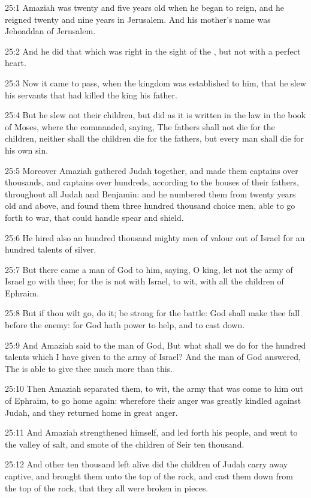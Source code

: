25:1 Amaziah was twenty and five years old when he began to reign, and he reigned twenty and nine years in Jerusalem. And his mother's name was Jehoaddan of Jerusalem.

25:2 And he did that which was right in the sight of the \LORD, but not with a perfect heart.

25:3 Now it came to pass, when the kingdom was established to him, that he slew his servants that had killed the king his father.

25:4 But he slew not their children, but did as it is written in the law in the book of Moses, where the \LORD commanded, saying, The fathers shall not die for the children, neither shall the children die for the fathers, but every man shall die for his own sin.

25:5 Moreover Amaziah gathered Judah together, and made them captains over thousands, and captains over hundreds, according to the houses of their fathers, throughout all Judah and Benjamin: and he numbered them from twenty years old and above, and found them three hundred thousand choice men, able to go forth to war, that could handle spear and shield.

25:6 He hired also an hundred thousand mighty men of valour out of Israel for an hundred talents of silver.

25:7 But there came a man of God to him, saying, O king, let not the army of Israel go with thee; for the \LORD is not with Israel, to wit, with all the children of Ephraim.

25:8 But if thou wilt go, do it; be strong for the battle: God shall make thee fall before the enemy: for God hath power to help, and to cast down.

25:9 And Amaziah said to the man of God, But what shall we do for the hundred talents which I have given to the army of Israel? And the man of God answered, The \LORD is able to give thee much more than this.

25:10 Then Amaziah separated them, to wit, the army that was come to him out of Ephraim, to go home again: wherefore their anger was greatly kindled against Judah, and they returned home in great anger.

25:11 And Amaziah strengthened himself, and led forth his people, and went to the valley of salt, and smote of the children of Seir ten thousand.

25:12 And other ten thousand left alive did the children of Judah carry away captive, and brought them unto the top of the rock, and cast them down from the top of the rock, that they all were broken in pieces.

